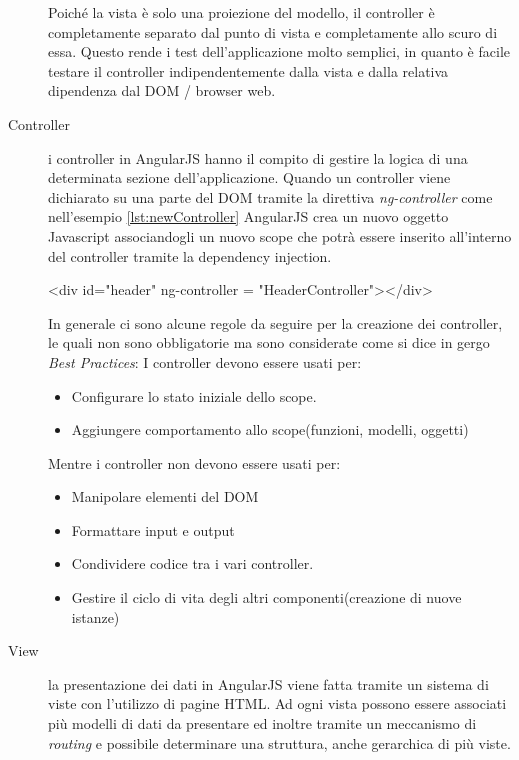 \begin{description}
Poiché la vista è solo una proiezione del modello, il controller è completamente separato dal punto di vista e completamente allo scuro di essa. Questo rende i test dell'applicazione molto semplici, in quanto è facile testare il controller indipendentemente dalla vista e dalla relativa dipendenza dal DOM / browser web.

\item[Controller] i controller in AngularJS hanno il compito di gestire la logica di una determinata sezione dell'applicazione. Quando un controller viene dichiarato su una parte del DOM tramite la direttiva \emph{ng-controller} come nell'esempio \ref{lst:newController} AngularJS crea un nuovo oggetto Javascript associandogli un nuovo scope che potrà essere inserito all'interno del controller tramite la dependency injection. 

\begin{code}[caption={Associazione tra un elemento del DOM e un controller}, label={lst:newController}]
	<div id="header" ng-controller = "HeaderController"></div>
\end{code}

In generale ci sono alcune regole da seguire per la creazione dei controller, le quali non sono obbligatorie ma sono considerate come si dice in gergo \emph{Best Practices}:
I controller devono essere usati per:

\begin{itemize}
\item Configurare lo stato iniziale dello scope.
\item Aggiungere comportamento allo scope(funzioni, modelli, oggetti)
\end{itemize}
Mentre i controller non devono essere usati per:
\begin{itemize}
\item Manipolare elementi del DOM
\item Formattare input e output
\item Condividere codice tra i vari controller.
\item Gestire il ciclo di vita degli altri componenti(creazione di nuove istanze)
\end{itemize}

\item[View] la presentazione dei dati in AngularJS viene fatta tramite un sistema di viste con l'utilizzo di pagine HTML. Ad ogni vista possono essere associati più modelli di dati da presentare ed inoltre tramite un meccanismo di \emph{routing} e possibile determinare una struttura, anche gerarchica di più viste. 


\end{description}
